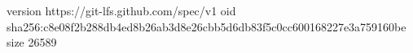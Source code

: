 version https://git-lfs.github.com/spec/v1
oid sha256:c8e08f2b288db4ed8b26ab3d8e26cbb5d6db83f5c0cc600168227e3a759160be
size 26589
